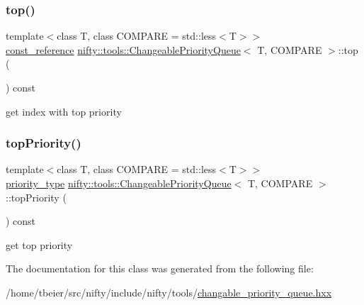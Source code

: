 \mbox{\label{classnifty_1_1tools_1_1ChangeablePriorityQueue_a550194380fddc3658871dbb64b59960d}} 
\subsubsection{\texorpdfstring{top()}{top()}}
{\footnotesize\ttfamily template$<$class T, class C\+O\+M\+P\+A\+RE = std\+::less$<$\+T$>$$>$ \\
\hyperlink{classnifty_1_1tools_1_1ChangeablePriorityQueue_acb7eb23bd9ca7c52955adc06bf4816c3}{const\+\_\+reference} \hyperlink{classnifty_1_1tools_1_1ChangeablePriorityQueue}{nifty\+::tools\+::\+Changeable\+Priority\+Queue}$<$ T, C\+O\+M\+P\+A\+RE $>$\+::top (\begin{DoxyParamCaption}{ }\end{DoxyParamCaption}) const\hspace{0.3cm}{\ttfamily [inline]}}



get index with top priority 

\mbox{\label{classnifty_1_1tools_1_1ChangeablePriorityQueue_a2839b67aa76dc79afd492466aeaea3dd}} 
\subsubsection{\texorpdfstring{top\+Priority()}{topPriority()}}
{\footnotesize\ttfamily template$<$class T, class C\+O\+M\+P\+A\+RE = std\+::less$<$\+T$>$$>$ \\
\hyperlink{classnifty_1_1tools_1_1ChangeablePriorityQueue_a6ecafb387f99a1cfa7ff5795c924682c}{priority\+\_\+type} \hyperlink{classnifty_1_1tools_1_1ChangeablePriorityQueue}{nifty\+::tools\+::\+Changeable\+Priority\+Queue}$<$ T, C\+O\+M\+P\+A\+RE $>$\+::top\+Priority (\begin{DoxyParamCaption}{ }\end{DoxyParamCaption}) const\hspace{0.3cm}{\ttfamily [inline]}}



get top priority 



The documentation for this class was generated from the following file\+:\begin{DoxyCompactItemize}
\item 
/home/tbeier/src/nifty/include/nifty/tools/\hyperlink{changable__priority__queue_8hxx}{changable\+\_\+priority\+\_\+queue.\+hxx}\end{DoxyCompactItemize}
